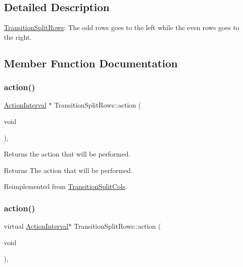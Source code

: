 \subsection{Detailed Description}
\hyperlink{classTransitionSplitRows}{Transition\+Split\+Rows}\+: The odd rows goes to the left while the even rows goes to the right. 

\subsection{Member Function Documentation}
\mbox{\label{classTransitionSplitRows_acd330cd9bde2c1fb7d3da21befa5918e}} 
\subsubsection{\texorpdfstring{action()}{action()}\hspace{0.1cm}{\footnotesize\ttfamily [1/2]}}
{\footnotesize\ttfamily \hyperlink{classActionInterval}{Action\+Interval} $\ast$ Transition\+Split\+Rows\+::action (\begin{DoxyParamCaption}\item[{void}]{ }\end{DoxyParamCaption})\hspace{0.3cm}{\ttfamily [override]}, {\ttfamily [virtual]}}

Returns the action that will be performed.

\begin{DoxyReturn}{Returns}
The action that will be performed. 
\end{DoxyReturn}


Reimplemented from \hyperlink{classTransitionSplitCols_a8b6074132330415cb925e15378363462}{Transition\+Split\+Cols}.

\mbox{\label{classTransitionSplitRows_ac24473a717ed730485921a329dc9c5de}} 
\subsubsection{\texorpdfstring{action()}{action()}\hspace{0.1cm}{\footnotesize\ttfamily [2/2]}}
{\footnotesize\ttfamily virtual \hyperlink{classActionInterval}{Action\+Interval}$\ast$ Transition\+Split\+Rows\+::action (\begin{DoxyParamCaption}\item[{void}]{ }\end{DoxyParamCaption})\hspace{0.3cm}{\ttfamily [override]}, {\ttfamily [virtual]}}

